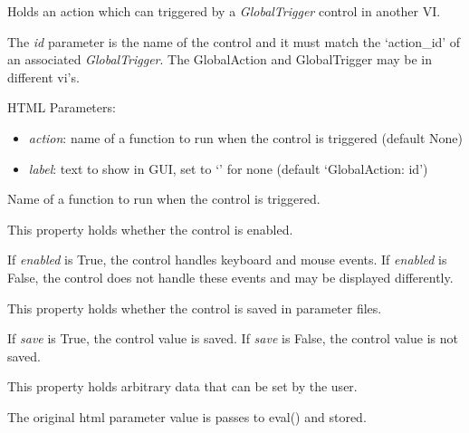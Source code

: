 \documentclass[letterpaper,10pt,english]{sphinxmanual}
\begin{document}
\begin{fulllineitems}
\label{api:controls.GlobalAction}
Holds an action which can triggered by a \emph{GlobalTrigger} control in another VI.

The \emph{id} parameter is the name of the control and it must match the
`action\_id' of an associated \emph{GlobalTrigger}. The GlobalAction and
GlobalTrigger may be in different vi's.

HTML Parameters:
\begin{itemize}
\item {} 
\emph{action}: name of a function to run when the control is triggered (default None)

\item {} 
\emph{label}: text to show in GUI, set to `' for none (default `GlobalAction: id')

\end{itemize}

\begin{fulllineitems}
\label{api:controls.GlobalAction.action}
Name of a function to run when the control is triggered.

\end{fulllineitems}


\begin{fulllineitems}
\label{api:controls.GlobalAction.enabled}
This property holds whether the control is enabled.

If \emph{enabled} is True, the control handles keyboard and mouse events.
If \emph{enabled} is False, the control does not handle these events and may
be displayed differently.

\end{fulllineitems}


\begin{fulllineitems}
\label{api:controls.GlobalAction.save}
This property holds whether the control is saved in parameter files.

If \emph{save} is True, the control value is saved.
If \emph{save} is False, the control value is not saved.

\end{fulllineitems}


\begin{fulllineitems}
\label{api:controls.GlobalAction.user}
This property holds arbitrary data that can be set by the user.

The original html parameter value is passes to eval() and stored.

\end{fulllineitems}


\end{fulllineitems}
\end{document}
